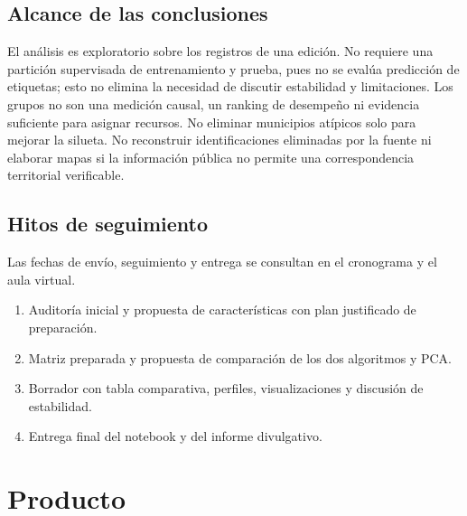 \documentclass[a4,11pt]{aleph-notas}
\begin{document}
\subsection*{Alcance de las conclusiones}
El análisis es exploratorio sobre los registros de una edición. No requiere una partición supervisada de entrenamiento y prueba, pues no se evalúa predicción de etiquetas; esto no elimina la necesidad de discutir estabilidad y limitaciones. Los grupos no son una medición causal, un ranking de desempeño ni evidencia suficiente para asignar recursos. No eliminar municipios atípicos solo para mejorar la silueta. No reconstruir identificaciones eliminadas por la fuente ni elaborar mapas si la información pública no permite una correspondencia territorial verificable.

\subsection*{Hitos de seguimiento}
Las fechas de envío, seguimiento y entrega se consultan en el cronograma y el aula virtual.
\begin{enumerate}[leftmargin=*, label={\textbf{Hito \arabic*.}}]
    \item Auditoría inicial y propuesta de características con plan justificado de preparación.
    \item Matriz preparada y propuesta de comparación de los dos algoritmos y PCA.
    \item Borrador con tabla comparativa, perfiles, visualizaciones y discusión de estabilidad.
    \item Entrega final del notebook y del informe divulgativo.
\end{enumerate}


\section*{Producto}
\end{document}
